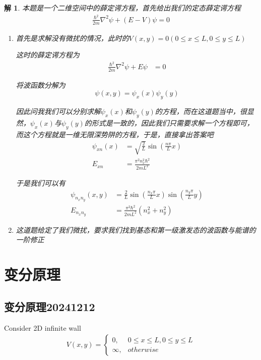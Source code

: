 \documentclass{article}
\newtheorem{solution}{解}
\begin{document}
\begin{solution}
    本题是一个二维空间中的薛定谔方程，首先给出我们的定态薛定谔方程
    \begin{align*}
        \frac{\hbar^2}{2m}\nabla^2\psi+(E-V)\psi=0
    \end{align*}

    \begin{enumerate}
        \item 首先是求解没有微扰的情况，此时的$V(x,y)=0(0\leq x \leq L,0\leq y\leq L)$
        
        这时的薛定谔方程为
        \begin{align*}
            \frac{\hbar^2}{2m}\nabla^2\psi+E\psi&=0
        \end{align*}

        将波函数分解为
        \[
            \psi(x,y)=\psi_x(x)\psi_y(y)
        \]

        因此问我我们可以分别求解$\psi_x(x)$和$\psi_y(y)$的方程，而在这道题当中，很显然，$\psi_x(x)$与$\psi_y(y)$的形式是一致的，因此我们只需要求解一个方程即可，而这个方程就是一维无限深势阱的方程，于是，直接拿出答案吧
        \begin{align*}
            \psi_{xn}(x)&=\sqrt{\frac{2}{L}}\sin(\frac{n\pi}{L}x)\\
            E_{xn}&=\frac{\pi^2n_x^2\hbar^2}{2mL^2}
        \end{align*}

        于是我们可以有
        \begin{align*}
            \psi_{n_xn_y}(x,y)&=\frac{2}{L}\sin(\frac{n_x\pi}{L}x)\sin(\frac{n_y\pi}{L}y)\\
            E_{n_xn_y}&=\frac{\pi^2\hbar^2}{2mL^2}(n_x^2+n_y^2)
        \end{align*}
        \item 这道题给定了我们微扰，要求我们找到基态和第一级激发态的波函数与能谱的一阶修正
    \end{enumerate}
\end{solution}






\section{变分原理}
\subsection{变分原理20241212}
Consider 2D infinite wall 
\begin{align*}
    V(x,y)=
    \begin{cases}
        0,&0\leq x \leq L,0\leq y\leq L\\
        \infty,&otherwise    
    \end{cases}
\end{align*}
\end{document}
